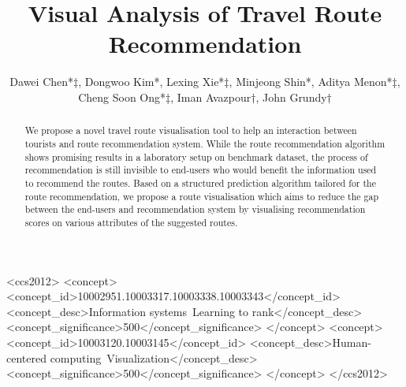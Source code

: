 \documentclass[sigconf]{acmart}
\begin{document}
\title{Visual Analysis of Travel Route Recommendation}

\author{Dawei Chen*$\ddagger$, Dongwoo Kim*, Lexing Xie*$\ddagger$,  Minjeong Shin*, Aditya Menon*$\ddagger$, Cheng Soon Ong*$\ddagger$, Iman Avazpour$\dagger$, John Grundy$\dagger$}


%

\renewcommand{\shortauthors}{D. Chen et al.}


\begin{abstract}
We propose a novel travel route visualisation tool to help an interaction between tourists and route recommendation system.  While the route recommendation algorithm shows promising results in a laboratory setup on benchmark dataset, the process of recommendation is still invisible to end-users who would benefit the information used to recommend the routes. Based on a structured prediction algorithm tailored for the route recommendation, we propose a route visualisation which aims to reduce the gap between the end-users and recommendation system by visualising recommendation scores on various attributes of the suggested routes.
\end{abstract}

%
%
\begin{CCSXML}
<ccs2012>
<concept>
<concept_id>10002951.10003317.10003338.10003343</concept_id>
<concept_desc>Information systems~Learning to rank</concept_desc>
<concept_significance>500</concept_significance>
</concept>
<concept>
<concept_id>10003120.10003145</concept_id>
<concept_desc>Human-centered computing~Visualization</concept_desc>
<concept_significance>500</concept_significance>
</concept>
</ccs2012>
\end{CCSXML}
\end{document}
